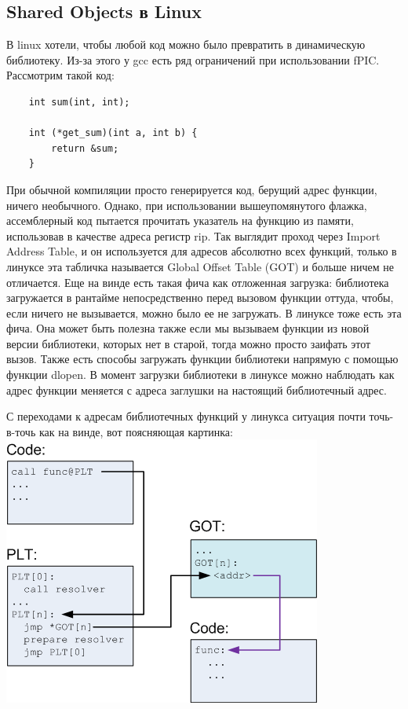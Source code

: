 \documentclass[12pt, a4paper]{article}
\begin{document}
\subsection{Shared Objects в Linux}
В linux хотели, чтобы любой код можно было превратить в динамическую библиотеку. Из-за этого у gcc есть ряд ограничений при использовании fPIC. Рассмотрим такой код:
\begin{verbatim}
	int sum(int, int);
	
	int (*get_sum)(int a, int b) {
		return &sum;
	}
\end{verbatim}
При обычной компиляции просто генерируется код, берущий адрес функции, ничего необычного. Однако, при использовании вышеупомянутого флажка, ассемблерный код пытается прочитать указатель на функцию из памяти, использовав в качестве адреса регистр rip. Так выглядит проход через Import Address Table, и он используется для адресов абсолютно всех функций, только в линуксе эта табличка называется Global Offset Table (GOT) и больше ничем не отличается. Еще на винде есть такая фича как отложенная загрузка: библиотека загружается в рантайме непосредственно перед вызовом функции оттуда, чтобы, если ничего не вызывается, можно было ее не загружать. В линуксе тоже есть эта фича. Она может быть полезна также если мы вызываем функции из новой версии библиотеки, которых нет в старой, тогда можно просто заифать этот вызов. Также есть способы загружать функции библиотеки напрямую с помощью функции dlopen. В момент загрузки библиотеки в линуксе можно наблюдать как адрес функции меняется с адреса заглушки на настоящий библиотечный адрес. \\
\par С переходами к адресам библиотечных функций у линукса ситуация почти точь-в-точь как на винде, вот поясняющая картинка:\\
\includegraphics[scale=0.65]{plt.png}\\\\
\end{document}
